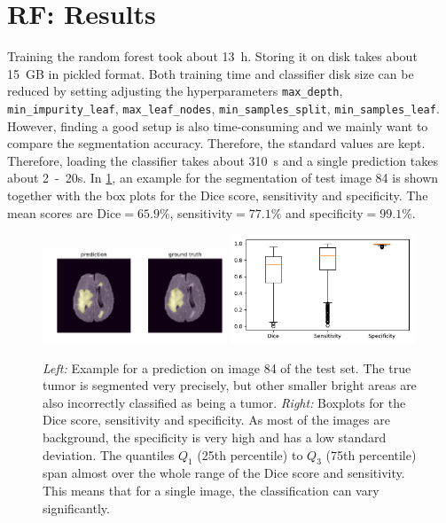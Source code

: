 \documentclass[final]{article}
\begin{document}
\section{RF: Results}
Training the random forest took about \SI{13}{h}. Storing it on disk takes
about \SI{15}{GB} in pickled format. Both training time and classifier disk
size can be reduced by setting adjusting the hyperparameters \verb+max_depth+,
\verb+min_impurity_leaf+, \verb+max_leaf_nodes+, \verb+min_samples_split+,
\verb+min_samples_leaf+. However, finding a good setup is also time-consuming
and we mainly want to compare the segmentation accuracy. Therefore, the
standard values are kept. Therefore, loading the classifier takes about
\SI{310}{s} and a single prediction takes about \si{2-20}{s}. In
\cref{fig:rfresults}, an example for the segmentation of test image 84 is shown
together with the box plots for the Dice score, sensitivity and specificity.
The mean scores are Dice$=65.9 \%$, sensitivity$=\num{77.1} \%$ and
specificity$=\num{99.1} \%$.

\begin{figure}
\includegraphics[width=0.49\textwidth]{rf_prediction_84}
\includegraphics[width=0.49\textwidth]{boxplot_rf}
\caption{\textit{Left:} Example for a prediction on image 84 of the test set.
The true tumor is segmented very precisely, but other smaller bright areas are
also incorrectly classified as being a tumor. \textit{Right:} Boxplots for the
Dice score, sensitivity and specificity. As most of the images are background,
the specificity is very high and has a low standard deviation. The quantiles
$Q_1$ (25th percentile) to $Q_3$ (75th percentile) span almost over the whole
range of the Dice score and sensitivity. This means that for a single image,
the classification can vary significantly.}
\label{fig:rfresults}
\end{figure}
\end{document}
